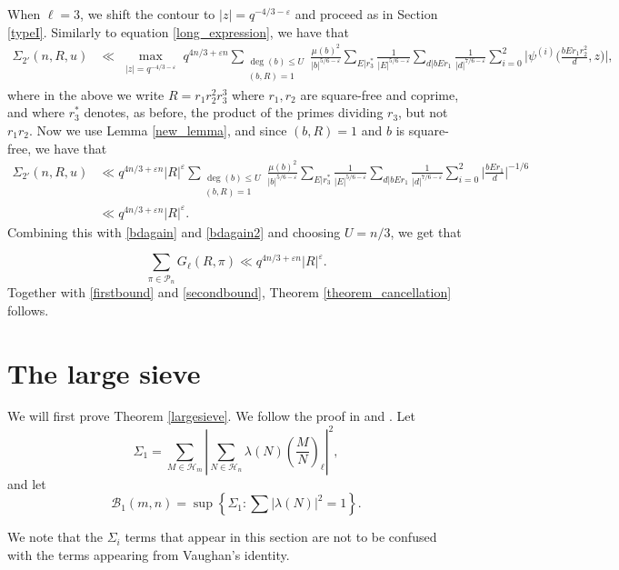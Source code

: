 \documentclass[12pt]{amsart}
\def\cH{\mathcal{H}}
\def\cH{\mathcal{H}}
\newcommand{\legl}[2]{\left( \frac{#1}{#2} \right)_\ell}
\begin{document}
When $\ell=3$, we shift the contour to $|z|=q^{-4/3-\varepsilon}$ and proceed as in Section \ref{typeI}.
Similarly to equation \eqref{long_expression}, we have that 
\begin{align*}
\Sigma_{2'}(n,R,u) &\ll \max_{\substack{|z|=q^{-4/3-\varepsilon}}} q^{4n/3+\varepsilon n} \sum_{\substack{\deg(b) \leq U \\ (b,R)=1}} \frac{\mu(b)^2}{|b|^{5/6-\varepsilon}}  \sum_{E|r_3^{*}} \frac{1}{|E|^{5/6-\varepsilon}}\sum_{d|bEr_1} \frac{1}{|d|^{7/6-\varepsilon}}  \sum_{i=0}^2 \Big| \psi^{(i)} \Big(  \frac{bEr_1r_2^2}{d},z \Big) \Big|,
\end{align*}
where in the above we write $R=r_1r_2^2r_3^3$ where $r_1, r_2$ are square-free and coprime, and where $r_3^{*}$ denotes, as before, the product of the primes dividing $r_3$, but not $r_1 r_2$. 
Now we use Lemma \ref{new_lemma}, and since $(b,R)=1$ and $b$ is square-free, we have that 
\begin{align*}
\Sigma_{2'}(n,R,u) &\ll q^{4n/3+\varepsilon n}|R|^{\varepsilon} \sum_{\substack{\deg(b) \leq U \\ (b,R)=1}} \frac{\mu(b)^2}{|b|^{5/6-\varepsilon}}  \sum_{E|r_3^{*}} \frac{1}{|E|^{5/6-\varepsilon}}\sum_{d|bEr_1} \frac{1}{|d|^{7/6-\varepsilon}}  \sum_{i=0}^2  \Big| \frac{bEr_1}{d} \Big|^{-1/6} \\
& \ll q^{4n/3+\varepsilon n}|R|^{\varepsilon}.
\end{align*}
Combining this with \eqref{bdagain} and \eqref{bdagain2} and choosing $U=n/3$, we get that

$$ \sum_{\pi \in \mathcal{P}_n} G_{\ell}(R,\pi) \ll q^{4n/3+\varepsilon n} |R|^{\varepsilon}.$$
Together with \eqref{firstbound} and \eqref{secondbound}, Theorem \ref{theorem_cancellation} follows.




\section{The large sieve}
\label{ls}
We will first prove Theorem \ref{largesieve}. We follow the proof in \cite{bgl} and \cite{HB00}. Let
$$\Sigma_1 = 
\sum_{M \in \cH_m} \left| \sum_{N \in \cH_n} \lambda(N) \legl{M}{N} \right|^2 ,$$
and let
$$\mathcal{B}_1(m,n) = \sup \left\{ \Sigma_1 : \sum |\lambda(N)|^2=1 \right\}.$$

We note that the $\Sigma_i$ terms that appear in this section are not to be confused with the terms appearing from Vaughan's identity.
\end{document}
